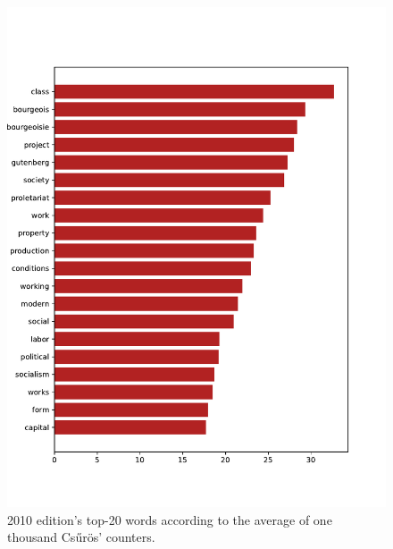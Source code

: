 \begin{figure}[!ht]
    \centering
    \includegraphics[width=0.9\linewidth]{figs/2010.epub-csuros-1000}
    \caption{2010 edition's top-20 words according to the average of one thousand Csűrös' counters.}
    \label{fig:2010-20-csuros}
\end{figure}


